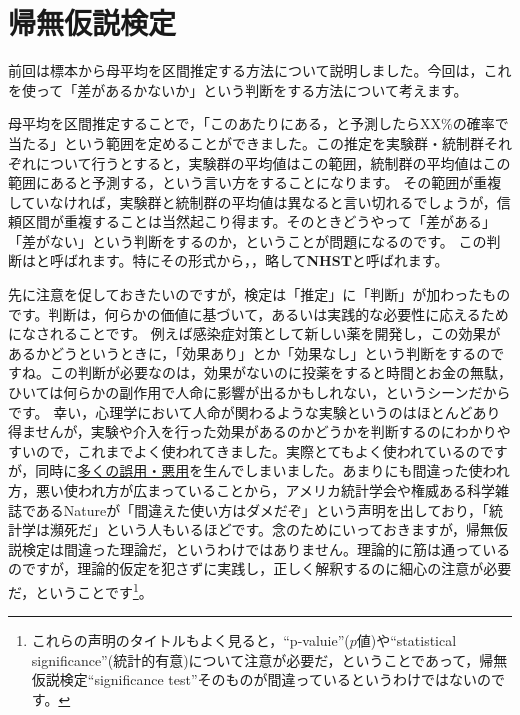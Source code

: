 \documentclass{ltjsbook}
\begin{document}
\chapter{帰無仮説検定}
\label{chapter18}
前回は標本から母平均を区間推定する方法について説明しました。今回は，これを使って「差があるかないか」という判断をする方法について考えます。

母平均を区間推定することで，「このあたりにある，と予測したらXX\%の確率で当たる」という範囲を定めることができました。この推定を実験群・統制群それぞれについて行うとすると，実験群の平均値はこの範囲，統制群の平均値はこの範囲にあると予測する，という言い方をすることになります。
その範囲が重複していなければ，実験群と統制群の平均値は異なると言い切れるでしょうが，信頼区間が重複することは当然起こり得ます。そのときどうやって「差がある」「差がない」という判断をするのか，ということが問題になるのです。
この判断はと呼ばれます。特にその形式から，，略して\textbf{NHST}と呼ばれます。

先に注意を促しておきたいのですが，検定は「推定」に「判断」が加わったものです。判断は，何らかの価値に基づいて，あるいは実践的な必要性に応えるためになされることです。
例えば感染症対策として新しい薬を開発し，この効果があるかどうというときに，「効果あり」とか「効果なし」という判断をするのですね。この判断が必要なのは，効果がないのに投薬をすると時間とお金の無駄，ひいては何らかの副作用で人命に影響が出るかもしれない，というシーンだからです。
幸い，心理学において人命が関わるような実験というのはほとんどあり得ませんが，実験や介入を行った効果があるのかどうかを判断するのにわかりやすいので，これまでよく使われてきました。実際とてもよく使われているのですが，同時に\underline{多くの誤用・悪用}を生んでしまいました。あまりにも間違った使われ方，悪い使われ方が広まっていることから，アメリカ統計学会や権威ある科学雑誌であるNatureが「間違えた使い方はダメだぞ」という声明を出しており\citep{wasserstein2016asa,amrhein2019scientists}，「統計学は瀕死だ」という人もいるほどです\citep{豊田202003}。念のためにいっておきますが，帰無仮説検定は間違った理論だ，というわけではありません。理論的に筋は通っているのですが，理論的仮定を犯さずに実践し，正しく解釈するのに細心の注意が必要だ，ということです\footnote{これらの声明のタイトルもよく見ると，``p-valuie''($p$値)や``statistical significance''(統計的有意)について注意が必要だ，ということであって，帰無仮説検定``significance test''そのものが間違っているというわけではないのです。}。
\end{document}
